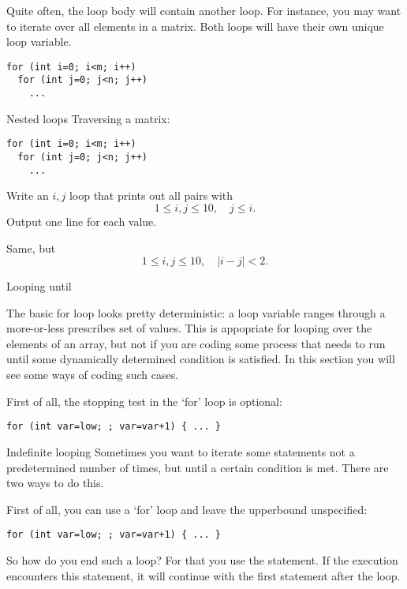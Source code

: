 Quite often, the loop body will contain another loop. For instance,
you may want to iterate over all elements in a matrix. Both loops will
have their own unique loop variable.
\begin{verbatim}
for (int i=0; i<m; i++)
  for (int j=0; j<n; j++)
    ...
\end{verbatim}

\begin{slide}{Nested loops}
  \label{sl:for-nest}
  Traversing a matrix:
\begin{verbatim}
for (int i=0; i<m; i++)
  for (int j=0; j<n; j++)
    ...
\end{verbatim}
\end{slide}

\begin{exercise}
  \label{ex:ij-triangle}
  Write an $i,j$ loop that prints out all pairs with
  \[ 1\leq i,j\leq 10,\quad  j\leq i. \]
  Output one line for each  value.

  Same, but 
  \[ 1\leq i,j\leq 10,\quad |i-j|<2. \]
\end{exercise}

 {Looping until}
\label{sec:loopuntil}

The basic for loop looks pretty deterministic: a loop variable ranges
through a more-or-less prescribes set of values. This is appopriate
for looping over the elements of an array, but not if you are coding
some process that needs to run until some dynamically determined
condition is satisfied. In this section you will see some ways of
coding such cases.

First of all, the stopping test in the `for' loop is optional:
\begin{verbatim}
for (int var=low; ; var=var+1) { ... }
\end{verbatim}

\begin{slide}{Indefinite looping}
  \label{sl:for-inf}
  Sometimes you want to iterate some statements not a predetermined
  number of times, but until a certain condition is met. There are two
  ways to do this.

  First of all, you can use a `for' loop and leave the upperbound
  unspecified:
\begin{verbatim}
for (int var=low; ; var=var+1) { ... }
\end{verbatim}
\end{slide}

So how do you end such a loop? For that you use the
 statement. If the execution encounters this
statement, it will continue with the first statement after the loop.

